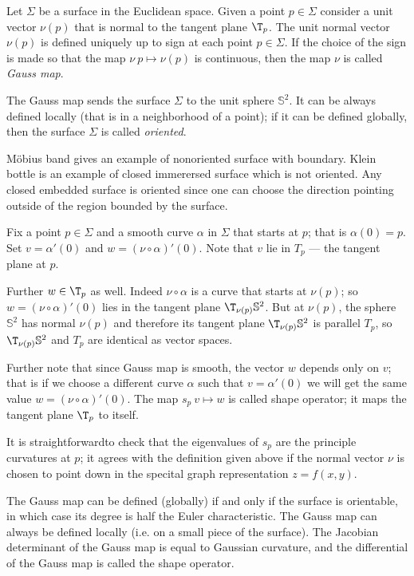 Let $\Sigma$ be a surface in the Euclidean space.
Given a point $p\in\Sigma$ consider a unit vector $\nu(p)$ that is normal to the tangent plane $\T_p$. 
The unit normal vector $\nu(p)$ is defined uniquely up to sign at each point $p\in \Sigma$.
If the choice of the sign is made so that the map $\nu\:p\mapsto \nu(p)$ is continuous,
then the map $\nu$ is called \emph{Gauss map}.

The Gauss map sends the surface $\Sigma$ to the unit sphere $\mathbb{S}^2$.
It can be always defined locally (that is in a neighborhood of a point);
if it can be defined globally, then the surface $\Sigma$ is called \emph{oriented}.

M\"obius band gives an example of nonoriented surface with boundary.
Klein bottle is an example of closed immerersed surface which is not oriented.
Any closed embedded surface is oriented since one can choose the  direction pointing outside of the region bounded by the surface.

Fix a point $p\in \Sigma$ and a smooth curve $\alpha$ in $\Sigma$ that starts at $p$;
that is $\alpha(0)=p$.
Set  $v=\alpha'(0)$ and $w=(\nu\circ\alpha)'(0)$.
Note that $v$ lie in $T_p$ --- the tangent plane at $p$.

Further $w\in \T_p$ as well.
Indeed $\nu\circ\alpha$ is a curve that starts at $\nu(p)$;
so $w=(\nu\circ\alpha)'(0)$ lies in the tangent plane $\T_{\nu(p)}\mathbb{S}^2$.
But at $\nu(p)$, the sphere $\mathbb{S}^2$ has normal $\nu(p)$ and therefore its tangent plane $\T_{\nu(p)}\mathbb{S}^2$ is parallel $T_p$, so $\T_{\nu(p)}\mathbb{S}^2$ and $T_p$ are identical as vector spaces.

Further note that since Gauss map is smooth,
the vector $w$ depends only on $v$;
that is if we choose a different curve $\alpha$ such that $v=\alpha'(0)$ we will get the same value $w=(\nu\circ\alpha)'(0)$.
The map $s_p\:v\mapsto w$ is called shape operator;
it maps the tangent plane $\T_p$ to itself.

It is straightforwardto check that the eigenvalues of $s_p$ are the principle curvatures at $p$; it agrees with the definition given above if the normal vector $\nu$ is chosen to point down in the specital graph representation $z=f(x,y)$.







The Gauss map can be defined (globally) if and only if the surface is orientable, in which case its degree is half the Euler characteristic. The Gauss map can always be defined locally (i.e. on a small piece of the surface). The Jacobian determinant of the Gauss map is equal to Gaussian curvature, and the differential of the Gauss map is called the shape operator. 


















